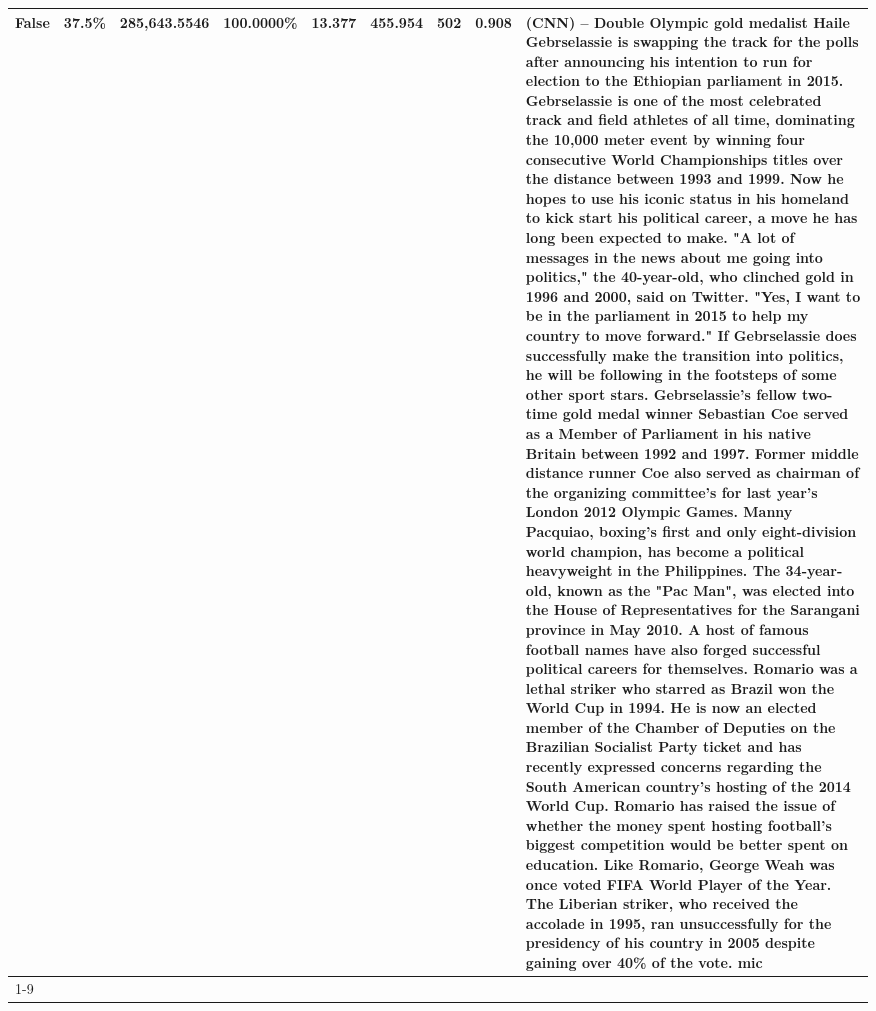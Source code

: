 \begin{table}[H]
{\begin{tabular}{lllrlllll}
False & 37.5\% & 285,643.5546 & \bfseries \color{red} 100.0000\% & 13.377 & 455.954 & 502 & 0.908 & (CNN) -- Double Olympic gold medalist Haile Gebrselassie is swapping the track for the polls after announcing his intention to run for election to the Ethiopian parliament in 2015. Gebrselassie is one of the most celebrated track and field athletes of all time, dominating the 10,000 meter event by winning four consecutive World Championships titles over the distance between 1993 and 1999. Now he hopes to use his iconic status in his homeland to kick start his political career, a move he has long been expected to make. "A lot of messages in the news about me going into politics," the 40-year-old, who clinched gold in 1996 and 2000, said on Twitter. "Yes, I want to be in the parliament in 2015 to help my country to move forward." If Gebrselassie does successfully make the transition into politics, he will be following in the footsteps of some other sport stars. Gebrselassie's fellow two-time gold medal winner Sebastian Coe served as a Member of Parliament in his native Britain between 1992 and 1997. Former middle distance runner Coe also served as chairman of the organizing committee's for last year's London 2012 Olympic Games. Manny Pacquiao, boxing's first and only eight-division world champion, has become a political heavyweight in the Philippines. The 34-year-old, known as the "Pac Man", was elected into the House of Representatives for the Sarangani province in May 2010. A host of famous football names have also forged successful political careers for themselves. Romario was a lethal striker who starred as Brazil won the World Cup in 1994. He is now an elected member of the Chamber of Deputies on the Brazilian Socialist Party ticket and has recently expressed concerns regarding the South American country's hosting of the 2014 World Cup. Romario has raised the issue of whether the money spent hosting football's biggest competition would be better spent on education. Like Romario, George Weah was once voted FIFA World Player of the Year. The Liberian striker, who received the accolade in 1995, ran unsuccessfully for the presidency of his country in 2005 despite gaining over 40\% of the vote. mic \\
\cline{1-9}

\end{tabular}}
\end{table}
